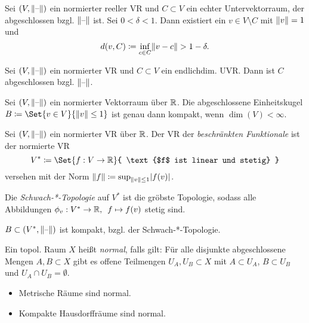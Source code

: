 \documentclass{cheat-sheet}
\begin{document}
\begin{lem}[Riesz]
  Sei $(V, \lVert\text{--}\rVert)$ ein normierter reeller VR und $C \subset V$ ein echter Untervektorraum, der abgeschlossen bzgl. $\lVert\text{--}\rVert$ ist. Sei $0 < \delta < 1$. Dann existiert ein $v \in V \setminus C$ mit $\lVert v\rVert = 1$ und
  \[ d(v, C) \coloneqq \inf_{c \in C} \lVert v - c\rVert > 1 - \delta. \]
\end{lem}

\begin{lem}
  Sei $(V, \lVert\text{--}\rVert)$ ein normierter VR und $C \subset V$ ein endlichdim. UVR. Dann ist $C$ abgeschlossen bzgl. $\lVert\text{--}\rVert$.
\end{lem}

\begin{prop}
  Sei $(V, \lVert\text{--}\rVert)$ ein normierter Vektorraum über $\mathbb{R}$. Die abgeschlossene Einheitskugel $B \coloneqq \Set{ v \in V }{ \norm{v} \leq 1 }$ ist genau dann kompakt, wenn $\dim(V) < \infty$.
\end{prop}

\begin{defn}
  Sei $(V, \lVert\text{--}\rVert)$ ein normierter VR über $\mathbb{R}$. Der VR der \emph{beschränkten Funktionale} ist der normierte VR
  \[ V^* \coloneqq \Set{ f : V \to \R }{ \text{$f$ ist linear und stetig} } \]
  versehen mit der Norm $\lVert f\rVert \coloneqq \sup_{\lVert v\rVert \leq 1} \lvert f(v)\rvert$.
\end{defn}

\begin{defn}
  Die \emph{Schwach-*-Topologie} auf $V^*$ ist die gröbste Topologie, sodass alle Abbildungen $\phi_v : V^* \to \mathbb{R}, \enspace f \mapsto f(v)$ stetig sind.
\end{defn}

\begin{satz}
  $B \subset (V^*, \lVert\text{--}\rVert)$ ist kompakt, bzgl. der Schwach-*-Topologie.
\end{satz}


\begin{defn}
  Ein topol. Raum $X$ heißt \emph{normal}, falls gilt: Für alle disjunkte abgeschlossene Mengen $A, B \subset X$ gibt es offene Teilmengen $U_A, U_B \subset X$ mit $A \subset U_A$, $B \subset U_B$ und $U_A \cap U_B = \emptyset$.
\end{defn}

\begin{bspe}
  \begin{itemize}
    \item Metrische Räume sind normal.
    \item Kompakte Hausdorffräume sind normal.
  \end{itemize}
\end{bspe}
\end{document}
